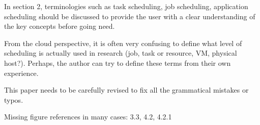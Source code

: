 In section 2, terminologies such as task scheduling, job scheduling, application scheduling should be discussed to provide the user with a clear understanding of the key concepts before going need.


From the cloud perspective, it is often very confusing to define what level of scheduling is actually used in research (job, task or resource, VM, physical host?). Perhaps, the author can try to define these terms from their own experience.


This paper needs to be carefully revised to fix all the grammatical mistakes or typos.


Missing figure references in many cases: 3.3, 4.2, 4.2.1



